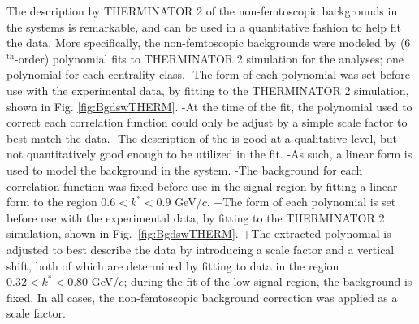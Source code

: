 \begin{table}[htbp]
\begin{table}[htbp]
 The description by THERMINATOR 2 of the non-femtoscopic backgrounds in the \LamKpm systems is remarkable, and can be used in a quantitative fashion to help fit the data.
 More specifically, the non-femtoscopic backgrounds were modeled by (6$^{\mathrm{th}}$-order) polynomial fits to THERMINATOR 2 simulation for the \LamKpm analyses; one polynomial for each centrality class.
-The form of each polynomial was set before use with the experimental data, by fitting to the THERMINATOR 2 simulation, shown in Fig. \ref{fig:BgdswTHERM}.
-At the time of the fit, the polynomial used to correct each correlation function could only be adjust by a simple scale factor to best match the data.
-The description of the \LamKs is good at a qualitative level, but not quantitatively good enough to be utilized in the fit.
-As such, a linear form is used to model the background in the \LamKs system.
-The background for each correlation function was fixed before use in the signal region by fitting a linear form to the region $0.6 < k^{*} < 0.9$ GeV/$c$.
+The form of each polynomial is set before use with the experimental data, by fitting to the THERMINATOR 2 simulation, shown in Fig.\ \ref{fig:BgdswTHERM}.
+The extracted polynomial is adjusted to best describe the data by introducing a scale factor and a vertical shift, both of which are determined by fitting to data in the region $0.32 < k^{*} < 0.80$ GeV/$c$; during the fit of the low-\kstar signal region, the background is fixed.
 In all cases, the non-femtoscopic background correction was applied as a scale factor.
 

\end{table}
\end{table}
